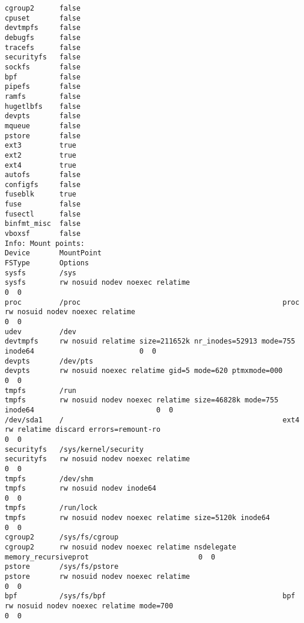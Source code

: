\begin{longlisting}
\begin{verbatim}
cgroup2      false
cpuset       false
devtmpfs     false
debugfs      false
tracefs      false
securityfs   false
sockfs       false
bpf          false
pipefs       false
ramfs        false
hugetlbfs    false
devpts       false
mqueue       false
pstore       false
ext3         true
ext2         true
ext4         true
autofs       false
configfs     false
fuseblk      true
fuse         false
fusectl      false
binfmt_misc  false
vboxsf       false
Info: Mount points:
Device       MountPoint                                           FSType       Options
sysfs        /sys                                                 sysfs        rw nosuid nodev noexec relatime                                                          0  0
proc         /proc                                                proc         rw nosuid nodev noexec relatime                                                          0  0
udev         /dev                                                 devtmpfs     rw nosuid relatime size=211652k nr_inodes=52913 mode=755 inode64                         0  0
devpts       /dev/pts                                             devpts       rw nosuid noexec relatime gid=5 mode=620 ptmxmode=000                                    0  0
tmpfs        /run                                                 tmpfs        rw nosuid nodev noexec relatime size=46828k mode=755 inode64                             0  0
/dev/sda1    /                                                    ext4         rw relatime discard errors=remount-ro                                                    0  0
securityfs   /sys/kernel/security                                 securityfs   rw nosuid nodev noexec relatime                                                          0  0
tmpfs        /dev/shm                                             tmpfs        rw nosuid nodev inode64                                                                  0  0
tmpfs        /run/lock                                            tmpfs        rw nosuid nodev noexec relatime size=5120k inode64                                       0  0
cgroup2      /sys/fs/cgroup                                       cgroup2      rw nosuid nodev noexec relatime nsdelegate memory_recursiveprot                          0  0
pstore       /sys/fs/pstore                                       pstore       rw nosuid nodev noexec relatime                                                          0  0
bpf          /sys/fs/bpf                                          bpf          rw nosuid nodev noexec relatime mode=700                                                 0  0

\end{verbatim}
\end{longlisting}
